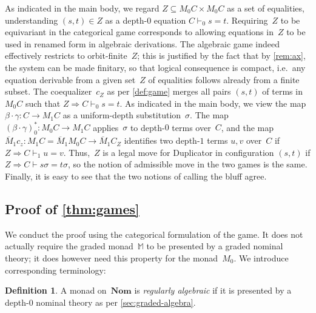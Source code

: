 \documentclass[11pt,a4paper]{amsart}
\newcommand{\centails}{\Rightarrow}
\newcommand{\mbar}{\overline{M}_1}
\theoremstyle{plain}
\numberwithin{equation}{section}
\newcommand{\monad}{{\mathbb{M}}}
\newcommand{\+}[1]{\mathcal{#1}\xspace}
\newcommand{\Nom}{\mathbf{Nom}}
\theoremstyle{definition}
\newtheorem{defn}[defn]{Definition}
\begin{document}
As indicated in the main body, we regard $Z\subseteq M_0C\times M_0C$
as a set of equalities, understanding $(s,t)\in Z$ as a depth-$0$
equation $C\vdash_0s=t$. Requiring~$Z$ to be equivariant in the
categorical game corresponds to allowing equations in~$Z$ to be used
in renamed form in algebraic derivations. The algebraic game indeed
effectively restricts to orbit-finite~$Z$; this is justified by the
fact that by \cref{rem:ax}, the system can be made finitary, so that
logical consequence is compact, i.e.~any equation derivable from a
given set~$Z$ of equalities follows already from a finite subset. The
coequalizer~$c_Z$ as per \cref{def:game} merges all pairs $(s,t)$ of
terms in $M_0C$ such that $Z\centails C\vdash_0 s=t$. As indicated in
the main body, we view the map $\beta\cdot\gamma\colon C\to M_1C$ as a
uniform-depth substitution~$\sigma$. The map
$(\beta\cdot\gamma)^*_0\colon M_0C\to M_1 C$ applies~$\sigma$ to
depth-$0$ terms over~$C$, and the map
$\mbar c_z\colon M_1C=\mbar M_0C\to\mbar C_Z$ identifies two depth-$1$
terms $u,v$ over~$C$ if $Z\centails C\vdash_1 u=v$. Thus,~$Z$ is a
legal move for Duplicator in configuration $(s,t)$ if
$Z\centails C\vdash s\sigma=t\sigma$, so the notion of admissible move
in the two games is the same. Finally, it is easy to see that the two
notions of calling the bluff agree.


\subsection*{Proof of  \cref{thm:games}}

We conduct the proof using the categorical formulation of the game. It
does not actually require the graded monad~$\monad$ to be presented by
a graded nominal theory; it does however need this property for the
monad~$M_0$. We introduce corresponding terminology:
\begin{defn}
  A monad on~$\Nom$ is \emph{regularly algebraic} if it is presented
  by a depth-$0$ nominal theory as per \cref{sec:graded-algebra}.
\end{defn}
\end{document}
